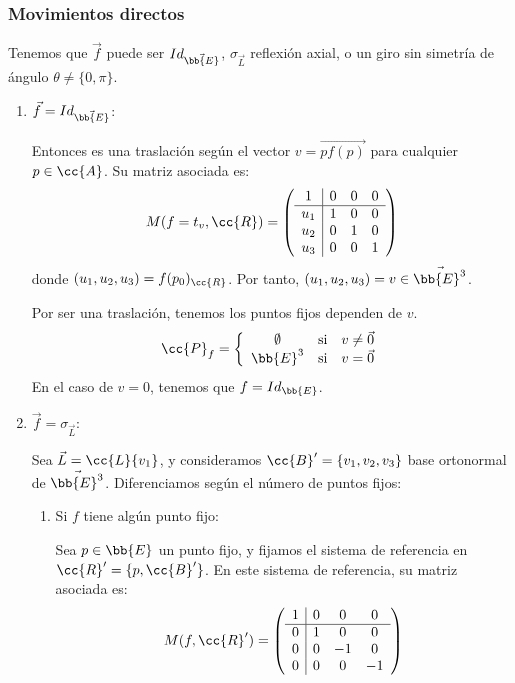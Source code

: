 \subsubsection{Movimientos directos}
Tenemos que $\vec{f}$ puede ser $Id_{\vec{\bb{E}}}$, $\sigma_{\vec{L}}$ reflexión axial, o un giro sin simetría de ángulo $\theta\neq \{0,\pi\}$.
\begin{enumerate}
    \item $\vec{f}=Id_{\vec{\bb{E}}}$:
    
    Entonces es una traslación según el vector $v=\vec{pf(p)}$ para cualquier $p\in \cc{A}$. Su matriz asociada es:
    \begin{equation*}
        M(f=t_v,\cc{R}) = \left(\begin{array}{c|ccc}
            1 & 0 & 0 & 0 \\ \hline
            u_1 & 1 & 0 & 0\\ 
            u_2 & 0 & 1 & 0 \\
            u_3 & 0 & 0 & 1
        \end{array}\right)
    \end{equation*}
    donde $(u_1,u_2,u_3)=f(p_0)_{\cc{R}}$. Por tanto, $(u_1, u_2, u_3)=v\in \vec{\bb{E}^3}$.

    Por ser una traslación, tenemos los puntos fijos dependen de $v$.
    \begin{equation*}
        \cc{P}_f = \left\{\begin{array}{ccc}
            \emptyset & \text{si} & v\neq \vec{0} \\
            \bb{E}^3 & \text{si} & v=\vec{0}
        \end{array}\right.
    \end{equation*}
    En el caso de $v=0$, tenemos que $f=Id_{\bb{E}}$.
    
    \item $\vec{f}=\sigma_{\vec{L}}$:

    Sea $\vec{L}=\cc{L}\{v_1\}$, y consideramos $\cc{B}'=\{v_1,v_2,v_3\}$ base ortonormal de $\vec{\bb{E}^3}$. Diferenciamos según el número de puntos fijos:
    \begin{enumerate}
        \item Si $f$ tiene algún punto fijo:

        Sea $p\in \bb{E}$ un punto fijo, y fijamos el sistema de referencia en $\cc{R}'=\{p,\cc{B}'\}$. En este sistema de referencia, su matriz asociada es:
        \begin{equation*}
            M(f,\cc{R}') = \left(\begin{array}{c|ccc}
                1 & 0 & 0 & 0 \\ \hline
                0 & 1 & 0 & 0\\ 
                0 & 0 & -1 & 0 \\
                0 & 0 & 0 & -1
            \end{array}\right)
        \end{equation*}


\end{enumerate}
\end{enumerate}

